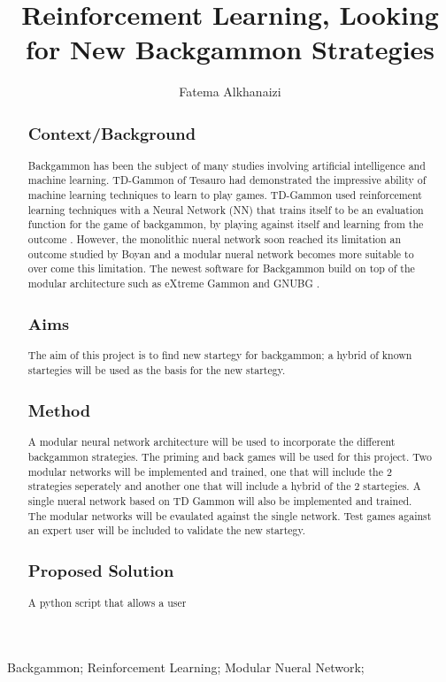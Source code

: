 \documentclass[12pt,a4paper]{article}
\title{Reinforcement Learning, Looking for New Backgammon Strategies}
\author{Fatema Alkhanaizi}
\date{}
\begin{document}
\maketitle

\begin{abstract}
\subsection{Context/Background}
Backgammon has been the subject of many studies involving artificial intelligence and machine learning. 
TD-Gammon  of Tesauro \cite{} had demonstrated the impressive ability of machine learning techniques to learn to play games. TD-Gammon used reinforcement learning techniques with a Neural Network (NN) that trains itself to be an evaluation function for the game of backgammon, by playing against itself and learning from the outcome \cite{}. However, the monolithic nueral network soon reached its limitation an outcome studied by Boyan \cite{} and a modular nueral network becomes more suitable to over come this limitation. The newest software for Backgammon build on top of the modular architecture such as eXtreme Gammon \cite{} and GNUBG \cite{}.
\subsection{Aims}
The aim of this project is to find new startegy for backgammon; a hybrid of known startegies will be used as the basis for the new startegy. 
\subsection{Method}
A modular neural network architecture will be used to incorporate the different backgammon strategies. The priming and back games will be used for this project. Two modular networks will be implemented and trained, one that will include the 2 strategies seperately and another one that will include a hybrid of the 2 startegies. A single nueral network based on TD Gammon will also be implemented and trained. The modular networks will be evaulated against the single network. Test games against an expert user will be included to validate the new startegy.
\subsection{Proposed Solution}
A python script that allows a user 

\end{abstract}
\begin{keywords}
Backgammon; Reinforcement Learning; Modular Nueral Network; 
\end{keywords}
\end{document}
